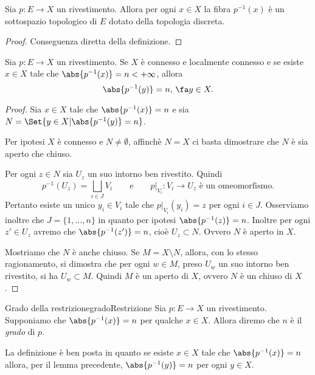 \begin{lem}
	Sia \(p\colon E \to X\) un rivestimento.
	Allora per ogni \(x\in X\) la fibra \(p^{-1}(x)\) è un sottospazio topologico di \(E\) dotato della topologia discreta.
\end{lem}

\begin{proof}
	Conseguenza diretta della definizione.
\end{proof}

\begin{lem}
	Sia \(p\colon E \to X\) un rivestimento.
	Se \(X\) è connesso e localmente connesso e se esiste \(x\in X\) tale che \(\abs{p^{-1}(x)}=n<+\infty\), allora
	\[
		\abs{p^{-1}(y)} = n,\,\fa y\in X.
	\]
\end{lem}

\begin{proof}
	Sia \(x\in X\) tale che \(\abs{p^{-1}(x)}=n\) e sia \(N=\Set{y\in X | \abs{p^{-1}(y)}=n}\).

	Per ipotesi \(X\) è connesso e \(N\neq \emptyset\), affinchè \(N=X\) ci basta dimostrare che \(N\) è sia aperto che chiuso.

	Per ogni \(z\in N\) sia \(U_z\) un suo intorno ben rivestito.
	Quindi
	\[
		p^{-1}(U_z) = \bigsqcup_{i\in J} V_i \qquad\text{e}\qquad p|_{V_i}\colon V_i \to U_z \text{ è un omeomorfismo}.
	\]
	Pertanto esiste un unico \(y_i\in V_i\) tale che \(p|_{V_i}(y_i)=z\) per ogni \(i\in J\).
	Osserviamo inoltre che \(J=\{1,\ldots,n\}\) in quanto per ipotesi \(\abs{p^{-1}(z)}=n\).
	Inoltre per ogni \(z'\in U_z\) avremo che \(\abs{p^{-1}(z')}=n\), cioè \(U_z\subset N\).
	Ovvero \(N\) è aperto in \(X\).

	Mostriamo che \(N\) è anche chiuso.
	Se \(M=X\setminus N\), allora, con lo stesso ragionamento, si dimostra che per ogni \(w\in M\), preso \(U_w\) un suo intorno ben rivestito, si ha \(U_w\subset M\).
	Quindi \(M\) è un aperto di \(X\), ovvero \(N\) è un chiuso di \(X\).
\end{proof}

\begin{defn}{Grado della restrizione}{gradoRestrizione}
	Sia \(p\colon E \to X\) un rivestimento.
	Supponiamo che \(\abs{p^{-1}(x)}=n\) per qualche \(x\in X\).
	Allora diremo che \(n\) è il \emph{grado} di \(p\).
\end{defn}

\begin{oss}
	La definizione è ben posta in quanto se esiste \(x\in X\) tale che \(\abs{p^{-1}(x)}=n\) allora, per il lemma precedente, \(\abs{p^{-1}(y)}=n\) per ogni \(y\in X\).
\end{oss}

